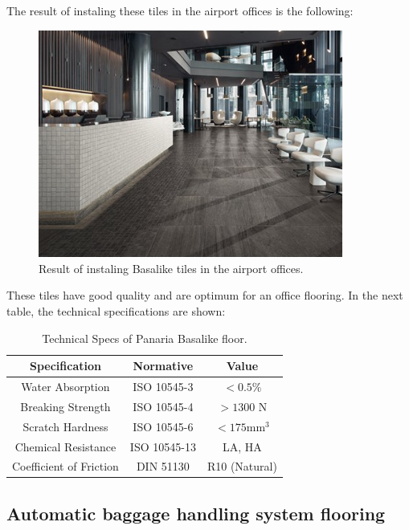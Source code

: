 The result of instaling these tiles in the airport offices is the following:
\begin{figure}[ht!]
	\centering
\includegraphics[width=10cm]{./images/Resultado4}
\caption{Result of instaling Basalike tiles in the airport offices.}
\end{figure}

These tiles have good quality and are optimum for an office flooring. In the next table, the technical specifications are shown:

	\begin{table}[ht!]
	\centering
	\begin{tabular}{|c|c|c|}
	\hline
	Specification & Normative & Value\\
	\hline
	Water Absorption & ISO 10545-3 & $<0.5\%$\\
	\hline
	Breaking Strength & ISO 10545-4 & $>1300$ N\\
	\hline
	Scratch Hardness & ISO 10545-6 & $< 175 \mathrm{mm^3}$\\
	\hline
	Chemical Resistance & ISO 10545-13 & LA, HA\\
	\hline
	Coefficient of Friction & DIN 51130 & R10 (Natural)\\
	\hline
	\end{tabular}
	\caption{Technical Specs of Panaria Basalike floor.}
	\end{table}
	
		\subsection{Automatic baggage handling system flooring}
		
